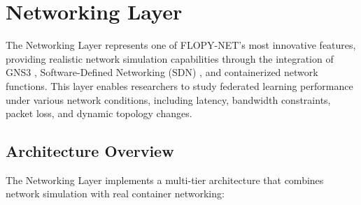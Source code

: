 \section{Networking Layer}
\label{sec:networking-layer}

The Networking Layer represents one of FLOPY-NET's most innovative features, providing realistic network simulation capabilities through the integration of GNS3 \cite{gns3}, Software-Defined Networking (SDN) \cite{kreutz2015software}, and containerized network functions. This layer enables researchers to study federated learning performance under various network conditions, including latency, bandwidth constraints, packet loss, and dynamic topology changes.

\subsection{Architecture Overview}

The Networking Layer implements a multi-tier architecture that combines network simulation with real container networking:

